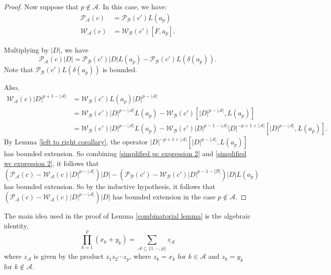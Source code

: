 \begin{proof}
        Now suppose that $p\notin \mathscr{A}$. In this case, we have:
        \begin{align*}
            \mathcal{P}_{\mathscr{A}}(c) &= \mathcal{P}_{\mathscr{B}}(c')L(a_p)\\
            \mathcal{W}_{\mathscr{A}}(c) &= \mathcal{W}_{\mathscr{B}}(c')[F,a_p].
        \end{align*}
        
        Multiplying by $|D|$, we have
        \begin{equation}\label{simplified pc expression 2}
            \mathcal{P}_{\mathscr{A}}(c)|D| = \mathcal{P}_{\mathscr{B}}(c')|D|L(a_p)-\mathcal{P}_{\mathscr{B}}(c')L(\delta(a_p)).
        \end{equation}
        Note that $\mathcal{P}_{\mathscr{B}}(c')L(\delta(a_p))$ is bounded.
        
        Also,
        \begin{align}\label{simplified wc expression 2}
            \mathcal{W}_{\mathscr{A}}(c)|D|^{p+1-|\mathscr{A}|} &= \mathcal{W}_{\mathscr{B}}(c')L(a_p)|D|^{p-|\mathscr{A}|}\nonumber\\
                                        &= \mathcal{W}_{\mathscr{B}}(c')|D|^{p-|\mathscr{A}|}L(a_p)-\mathcal{W}_{\mathscr{B}}(c')[|D|^{p-|\mathscr{A}|},L(a_p)]\nonumber\\
                                        &= \mathcal{W}_{\mathscr{B}}(c')|D|^{p-|\mathscr{A}|}L(a_p)-\mathcal{W}_{\mathscr{B}}(c')|D|^{p-1-|\mathscr{A}|}|D|^{-p+1+|\mathscr{A}|}[|D|^{p-|\mathscr{A}|},L(a_p)].
        \end{align}
        By Lemma \ref{left to right corollary}, the operator $|D|^{-p+1+|\mathscr{A}|}[|D|^{p-|\mathscr{A}|},L(a_p)]$ has bounded extension. So combining \eqref{simplified pc expression 2}
        and \eqref{simplified wc expression 2}, it follows that
        \begin{equation*}
            (\mathcal{P}_{\mathscr{A}}(c)-\mathcal{W}_{\mathscr{A}}(c)|D|^{p-|\mathscr{A}|})|D|-(\mathcal{P}_{\mathscr{B}}(c')-\mathcal{W}_{\mathscr{B}}(c')|D|^{p-1-|\mathscr{B}|})|D|L(a_p)
        \end{equation*} 
        has bounded extension. So by the inductive hypothesis, it follows that $(\mathcal{P}_{\mathscr{A}}(c)-\mathcal{W}_{\mathscr{A}}(c)|D|^{p-|\mathscr{A}|})|D|$ has bounded extension
        in the case $p \notin \mathscr{A}$.
    \end{proof}
    
    The main idea used in the proof of Lemma \ref{combinatorial lemma} is the algebraic identity,
    \begin{equation}\label{combinatorial fact}
        \prod_{k=1}^p (x_k+y_k) = \sum_{\mathscr{A} \subseteq \{1,\cdots,p\}} z_{\mathscr{\mathscr{A}}}
    \end{equation}
    where $z_{\mathscr{\mathscr{A}}}$ is given by the product $z_1z_2\cdots z_p$, where $z_k = x_k$ for $k \in \mathscr{A}$
    and $z_k = y_k$ for $k\notin \mathscr{A}$.
    
